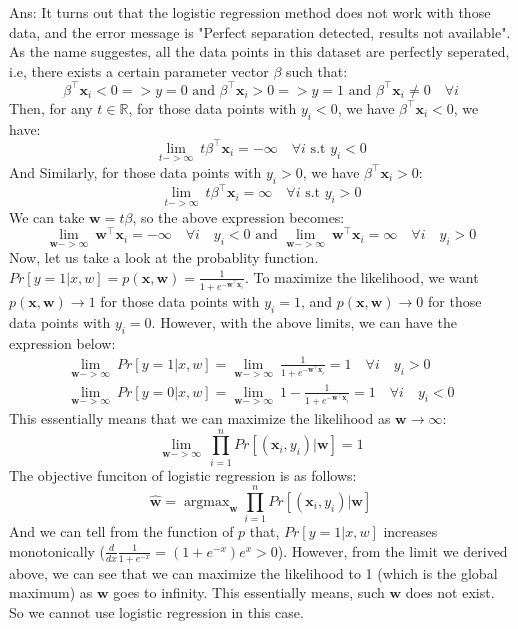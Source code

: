 \documentclass[10pt,letter,notitlepage]{article}
\newcommand{\RR}{\mathds{R}}
\newcommand{\argmax}{\mathop{\mathrm{argmax}}}
\newcommand{\wv}{\mathbf{w}}
\newcommand{\xv}{\mathbf{x}}
\newcommand{\ans}[1]{{\color{orange}\textsf{Ans}: #1}}
\newcounter{exercise}
\begin{document}
\begin{exercise}
\begin{enumerate}
\ans{
  It turns out that the logistic regression method does not work with those data, and the error message is "Perfect separation detected, results not available".
  As the name suggestes, all the data points in this dataset are perfectly seperated, i.e, there exists a certain parameter vector $\beta$ such that:
  $$
  \beta^\top\xv_i < 0 => y = 0 \text{ and } \beta^\top\xv_i > 0 => y = 1 \text{ and } \beta^\top\xv_i \ne 0 \quad \forall i
  $$
  Then, for any $t\in\RR$, for those data points with $y_i < 0$, we have $\beta^\top\xv_i < 0$, we have:
  $$
  \lim_{t->\infty} ~ t\beta^\top\xv_i = -\infty \quad \forall i \text{ s.t } y_i < 0
  $$
  And Similarly, for those data points with $y_i > 0$, we have $\beta^\top\xv_i > 0$:
  $$
  \lim_{t->\infty} ~ t\beta^\top\xv_i = \infty \quad \forall i \text{ s.t } y_i > 0
  $$
  We can take $\wv = t\beta$, so the above expression becomes:
  $$
  \lim_{\wv->\infty} ~ \wv^\top\xv_i = -\infty \quad \forall i \quad y_i < 0
  \text{ and }
  \lim_{\wv->\infty} ~ \wv^\top\xv_i = \infty \quad \forall i \quad y_i > 0
  $$
  Now, let us take a look at the probablity function. $Pr[y = 1 | x, w] = p(\xv, \wv) = \frac{1}{1+e^{-\wv^\top\xv_i}}$.
  To maximize the likelihood, we want $p(\xv, \wv) \rightarrow 1$ 
  for those data points with $y_i = 1$, and $p(\xv, \wv) \rightarrow 0$ for those data points with $y_i = 0$.
  \color{orange}
  However, with the above limits, we can have the expression below:
  \begin{align*}
  \lim_{\wv->\infty} ~ Pr[y = 1 | x, w] = \lim_{\wv->\infty} ~ \frac{1}{1+e^{-\wv^\top\xv_i}} = 1 \quad \forall i \quad y_i > 0 \\ 
  \lim_{\wv->\infty} ~ Pr[y = 0 | x, w] = \lim_{\wv->\infty} ~  1 - \frac{1}{1+e^{-\wv^\top\xv_i}} = 1 \quad \forall i \quad y_i < 0
  \end{align*}
  This essentially means that we can maximize the likelihood as $\wv \rightarrow \infty$:
  $$
  \lim_{\wv->\infty} ~ \prod_{i=1}^{n} Pr[(\xv_i, y_i) | \wv] = 1
  $$
  The objective funciton of logistic regression is as follows:
  $$
  \hat{\wv} = \argmax_{\wv} \prod_{i=1}^{n} Pr[(\xv_i, y_i) | \wv]
  $$
  And we can tell from the function of $p$ that, $Pr[y = 1 | x, w]$ increases monotonically ($\frac{d}{dx}\frac{1}{1+e^{-x}} = (1+e^{-x})e^x > 0$). 
  However, from the limit we derived above, we can see that we can maximize the likelihood to 1 (which is the global maximum) as $\wv$ goes to infinity. 
  This essentially means, such $\wv$ does not exist. So we cannot use logistic regression in this case.

}
\end{enumerate}
\end{exercise}
\end{document}
